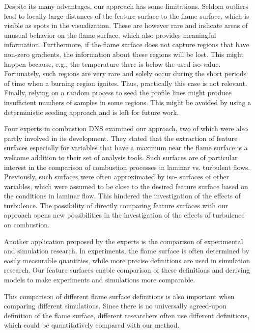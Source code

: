 %
Despite its many advantages, our approach has some limitations. Seldom outliers
lead to locally large distances of the feature surface to the flame surface,
which is visible as spots in the visualization. These are however rare and
indicate areas of unusual behavior on the flame surface, which also provides
meaningful information.
%
%
Furthermore, if the flame surface does not capture regions that have non-zero
gradients, the information about these regions will be lost. This might happen
because, e.g., the temperature there is below the used iso-value. Fortunately,
such regions are very rare and solely occur during the short periods of time
when a burning region ignites. Thus, practically this case is not relevant.
%
%
Finally, relying on a random process to seed the profile lines might produce
insufficient numbers of samples in some regions. This might be avoided by using
a deterministic seeding approach and is left for future work.

Four experts in combustion \ac{DNS} examined our approach, two of which were also
partly involved in its development. They stated that the extraction of feature
surfaces especially for variables that have a maximum near the flame surface is
a welcome addition to their set of analysis tools. Such surfaces are of
particular interest in the comparison of combustion processes in laminar vs.
turbulent flows. Previously, such surfaces were often approximated by iso-
surfaces of other variables, which were assumed to be close to the desired
feature surface based on the conditions in laminar flow. This hindered the
investigation of the effects of turbulence. The possibility of directly
comparing feature surfaces with our approach opens new possibilities in the
investigation of the effects of turbulence on combustion.

Another application proposed by the experts is the comparison of experimental
and simulation research. In experiments, the flame surface is often determined
by easily measurable quantities, while more precise definitions are used in
simulation research. Our feature surfaces enable comparison of these definitions
and deriving models to make experiments and simulations more comparable.

This comparison of different flame surface definitions is also important when
comparing different simulations. Since there is no universally agreed-upon
definition of the flame surface, different researchers often use different
definitions, which could be quantitatively compared with our method.

